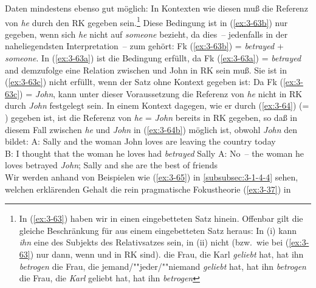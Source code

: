 \documentclass[output=paper]{langsci/langscibook}
\begin{document}
Daten mindestens ebenso gut möglich: In Kontexten wie diesen muß die
Referenz von \textit{he} durch den RK gegeben sein.\footnote{\label{fn:3-18}%
	In (\ref{ex:3-63}) haben wir  in einen
  eingebetteten Satz hinein. Offenbar gilt die gleiche Beschränkung für
   aus einem eingebetteten Satz
  heraus: In (i) kann \textit{ihn} eine  des Subjekts des Relativsatzes
  sein, in (ii) nicht (bzw.\ wie bei (\ref{ex:3-63}) nur dann, wenn  und  in RK sind).
  \ea
  \label{ex:3-fn18i}
  die Frau, die Karl \textit{geliebt} hat, hat ihn \textit{betrogen}
  \zmid 
  \eal
  \label{ex:3-fn18ii}
  \ex
  \label{ex:3-fn18iia}
  die Frau, die jemand/""jeder/""niemand \textit{geliebt} hat, hat ihn \textit{betrogen}
  \ex
  \label{ex:3-fn18iib}
  die Frau, die \textit{Karl} geliebt hat, hat ihn \textit{betrogen}
  \zllast%
}
Diese Bedingung ist in (\ref{ex:3-63b}) nur gegeben, wenn sich \textit{he} nicht auf
\textit{someone} bezieht, da dies~-- jedenfalls in der naheliegendsten
Interpretation~-- zum  gehört: Fk (\ref{ex:3-63b}) = \textit{betrayed} +
\textit{someone}. In (\ref{ex:3-63a}) ist die Bedingung erfüllt, da Fk (\ref{ex:3-63a}) =
\textit{betrayed} and demzufolge eine Relation zwischen  und John in RK sein muß. Sie ist in (\ref{ex:3-63c}) nicht erfüllt, wenn der Satz ohne Kontext gegeben ist: Da Fk (\ref{ex:3-63c}) =
\textit{John}, kann unter dieser Voraussetzung die Referenz von
\textit{he} nicht in RK durch \textit{John} festgelegt sein. In einem Kontext
dagegen, wie er durch (\ref{ex:3-64}) (= \citealt[101 (25)]{Rochemont78}) gegeben
ist, ist die Referenz von \textit{he} = \textit{John} bereits in RK
gegeben, so daß in diesem Fall  zwischen \textit{he} und
\textit{John} in (\ref{ex:3-64b}) möglich ist, obwohl \textit{John} den  bildet:
\eal
\label{ex:3-64}
\ex
\label{ex:3-64a}
A: \hspace{1ex} Sally and the woman John loves are leaving the country today\\
B: \hspace{1ex} I thought that the woman he loves had \textit{betrayed} Sally
\ex
\label{ex:3-64b}
A: \hspace{1ex} No~-- the woman he loves betrayed \textit{John}; Sally and she are
the best of friends\\
\zl
Wir werden anhand von Beispielen wie (\ref{ex:3-65}) in \ref{subsubsec:3-1-4-4} sehen, welchen
erklärenden Gehalt die rein pragmatische Fokustheorie (\ref{ex:3-37}) in
\end{document}

